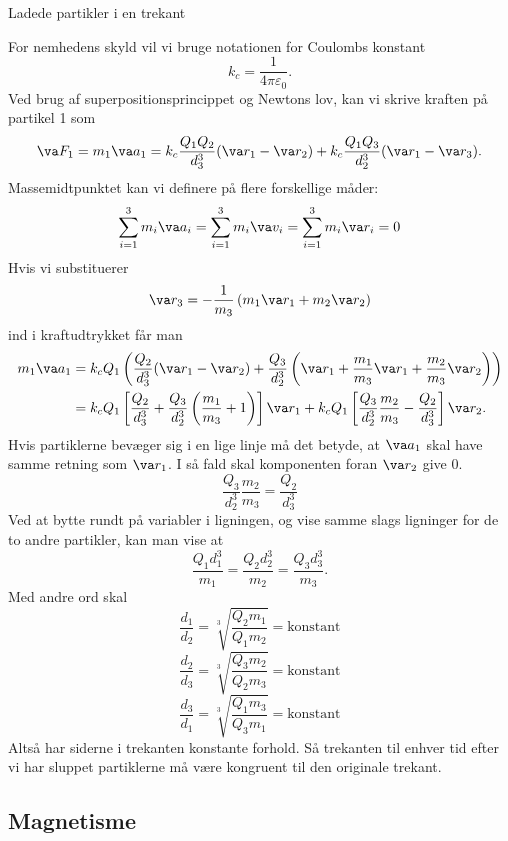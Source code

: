 \begin{opgave}{Ladede partikler i en trekant}
\begin{enumerate}
    \end{enumerate}
    For nemhedens skyld vil vi bruge notationen for Coulombs konstant
    \[ k_c=\frac{1}{4\pi\varepsilon_0}. \]
    Ved brug af superpositionsprincippet og Newtons lov, kan vi skrive kraften på partikel 1 som
    \[ \va F_1=m_1\va a_1=k_c\frac{Q_1Q_2}{d_3^3}(\va r_1-\va r_2)+k_c\frac{Q_1Q_3}{d_2^3}(\va r_1-\va r_3). \]
    Massemidtpunktet kan vi definere på flere forskellige måder:
    \[ \sum_{i=1}^3 m_i\va a_i=\sum_{i=1}^3 m_i\va v_i=\sum_{i=1}^3 m_i \va r_i=0 \]
    Hvis vi substituerer
    \[ \va r_3=-\frac{1}{m_3}\left(m_1\va r_1+ m_2\va r_2\right) \]
    ind i kraftudtrykket får man
    \begin{align*} 
        m_1\va a_1&=k_cQ_1\left(\frac{Q_2}{d_3^3}(\va r_1-\va r_2)+\frac{Q_3}{d_2^3}\left(\va r_1+\frac{m_1}{m_3}\va r_1+\frac{m_2}{m_3}\va r_2\right)\right)\\
        &=k_cQ_1\left[\frac{Q_2}{d_3^3}+\frac{Q_3}{d_2^3}\left(\frac{m_1}{m_3}+1\right)\right]\va r_1 +k_cQ_1\left[\frac{Q_3}{d_2^3}\frac{m_2}{m_3}-\frac{Q_2}{d_3^3}\right]\va r_2.
    \end{align*}
    Hvis partiklerne bevæger sig i en lige linje må det betyde, at $\va a_1$ skal have samme retning som $\va r_1$. I så fald skal komponenten foran $\va r_2$ give 0.
    \[ \frac{Q_3}{d_2^3}\frac{m_2}{m_3}=\frac{Q_2}{d_3^3} \]
    Ved at bytte rundt på variabler i ligningen, og vise samme slags ligninger for de to andre partikler, kan man vise at
    \[ \frac{Q_1d_1^3}{m_1}=\frac{Q_2d_2^3}{m_2}=\frac{Q_3d_3^3}{m_3}. \]
    Med andre ord skal
    \[ \frac{d_1}{d_2}=\sqrt[3]{\frac{Q_2m_1}{Q_1m_2}}=\text{konstant} \]
    \[ \frac{d_2}{d_3}=\sqrt[3]{\frac{Q_3m_2}{Q_2m_3}}=\text{konstant} \]
    \[ \frac{d_3}{d_1}=\sqrt[3]{\frac{Q_1m_3}{Q_3m_1}}=\text{konstant} \]
    Altså har siderne i trekanten konstante forhold. Så trekanten til enhver tid efter vi har sluppet partiklerne må være kongruent til den originale trekant.
\end{opgave}


\subsection*{Magnetisme}

